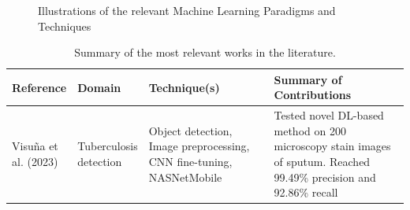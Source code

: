 \documentclass[../main.tex]{subfiles}
\begin{document}
    \newpage

    \begin{figure}
        \centering
        \caption{Illustrations of the relevant Machine Learning Paradigms and Techniques}
        \resizebox*{1.15\columnwidth}{!}{
            \hspace*{-1.5cm}
            
        }
        \label{fig:relevant_ml_paradigms}
    \end{figure}
    \clearpage

    \newpage
    \begin{table}[p]
        \caption{Summary of the most relevant works in the literature.}
        \label{tab:sota_summary}
        \hspace*{-1.5cm}
        \begin{tabular}{
            p{0.14\linewidth} | p{0.13\linewidth} | p{0.35\linewidth} | p{0.5\linewidth} 
        }
        \toprule
        \textbf{Reference} & \textbf{Domain} &\textbf{Technique(s)} & \textbf{Summary of Contributions} \\
        \midrule
        Visuña et al. (2023) \cite{visuna_novel_2023} & Tuberculosis detection & Object detection, Image preprocessing, CNN fine-tuning, NASNetMobile & Tested novel DL-based method on 200 microscopy stain images of sputum. Reached  99.49\% precision and 92.86\% recall \\
        \bottomrule
        \end{tabular}
    \end{table}


   
    
\end{document}
